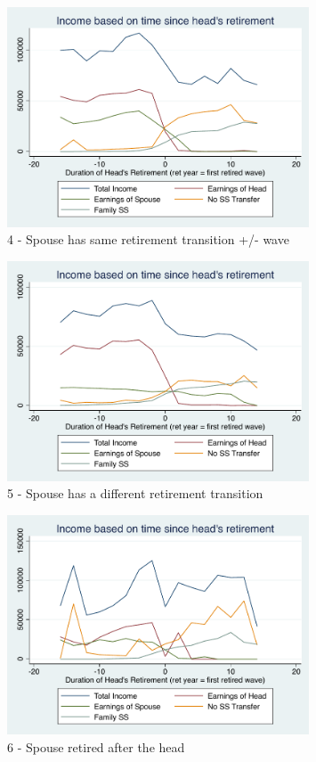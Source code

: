 \documentclass[11pt,onecolumn]{article}
\numberwithin{figure}{section}
\begin{document}
\begin{figure}[h]
	\caption{4 - Spouse has same retirement transition +/- wave}
	\centering
	\includegraphics[width=0.8\textwidth]{../IncomeAroundRetirement/Income_with_spouse_definition_4.pdf}
\end{figure}

\begin{figure}[h]
	\caption{5 - Spouse has a different retirement transition}
	\centering
	\includegraphics[width=0.8\textwidth]{../IncomeAroundRetirement/Income_with_spouse_definition_5.pdf}
\end{figure}

\begin{figure}[h]
	\caption{6 - Spouse retired after the head}
	\centering
	\includegraphics[width=0.8\textwidth]{../IncomeAroundRetirement/Income_with_spouse_definition_6.pdf}
\end{figure}
\end{document}
